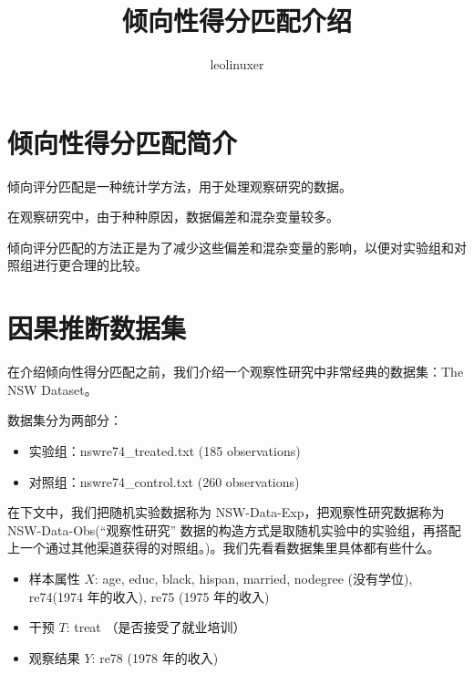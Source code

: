 \documentclass[12pt]{article}
\title{倾向性得分匹配介绍\cite{Talk_About_Causal_Inference_Part_2}}
\author{leolinuxer}
\begin{document}
\maketitle
\tableofcontents

\section{倾向性得分匹配简介}
\begin{framed}
倾向评分匹配是一种统计学方法，用于处理观察研究的数据。

在观察研究中，由于种种原因，数据偏差和混杂变量较多。

倾向评分匹配的方法正是为了减少这些偏差和混杂变量的影响，以便对实验组和对照组进行更合理的比较。
\end{framed}

\section{因果推断数据集}
在介绍倾向性得分匹配之前，我们介绍一个观察性研究中非常经典的数据集：The NSW Dataset。

数据集分为两部分：
\begin{itemize}
\setlength{\itemsep}{0pt}
\setlength{\parsep}{0pt}
\setlength{\parskip}{0pt}
    \item 实验组：nswre74\_treated.txt (185 observations)
    \item 对照组：nswre74\_control.txt (260 observations)
\end{itemize}

在下文中，我们把随机实验数据称为 NSW-Data-Exp，把观察性研究数据称为 NSW-Data-Obs(“观察性研究” 数据的构造方式是取随机实验中的实验组，再搭配上一个通过其他渠道获得的对照组。)。我们先看看数据集里具体都有些什么。
\begin{itemize}
\setlength{\itemsep}{0pt}
\setlength{\parsep}{0pt}
\setlength{\parskip}{0pt}
    \item 样本属性 $X$: age, educ, black, hispan, married, nodegree (没有学位), re74(1974 年的收入), re75 (1975 年的收入)
    \item 干预 $T$: treat （是否接受了就业培训）
    \item 观察结果 $Y$: re78 (1978 年的收入)
\end{itemize}
\end{document}
